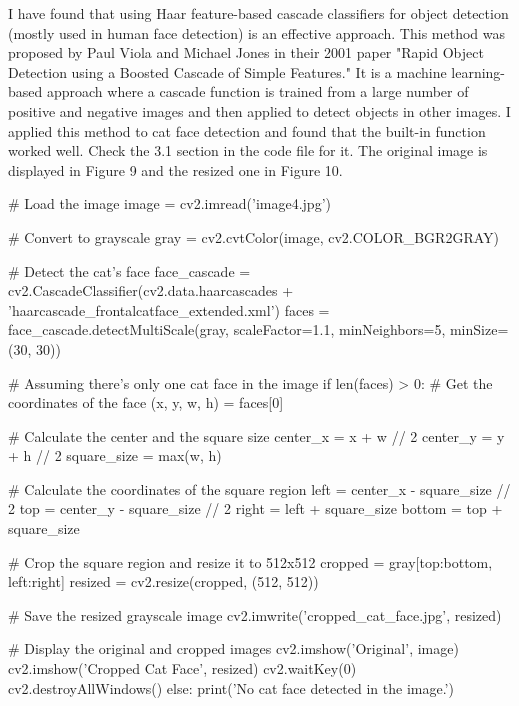 \documentclass[12pt]{article}
\begin{document}
\quad I have found that using Haar feature-based cascade classifiers for object detection (mostly used in human face detection) is an effective approach. This method was proposed by Paul Viola and Michael Jones in their 2001 paper "Rapid Object Detection using a Boosted Cascade of Simple Features." It is a machine learning-based approach where a cascade function is trained from a large number of positive and negative images and then applied to detect objects in other images. I applied this method to cat face detection and found that the built-in function worked well. Check the 3.1 section in the code file for it. The original image is displayed in Figure 9 and the resized one in Figure 10.
\begin{python}
# Load the image
image = cv2.imread('image4.jpg')

# Convert to grayscale
gray = cv2.cvtColor(image, cv2.COLOR_BGR2GRAY)

# Detect the cat's face
face_cascade = cv2.CascadeClassifier(cv2.data.haarcascades + 'haarcascade_frontalcatface_extended.xml')
faces = face_cascade.detectMultiScale(gray, scaleFactor=1.1, minNeighbors=5, minSize=(30, 30))

# Assuming there's only one cat face in the image
if len(faces) > 0:
    # Get the coordinates of the face
    (x, y, w, h) = faces[0]
    
    # Calculate the center and the square size
    center_x = x + w // 2
    center_y = y + h // 2
    square_size = max(w, h)
    
    # Calculate the coordinates of the square region
    left = center_x - square_size // 2
    top = center_y - square_size // 2
    right = left + square_size
    bottom = top + square_size
    
    # Crop the square region and resize it to 512x512
    cropped = gray[top:bottom, left:right]
    resized = cv2.resize(cropped, (512, 512))
    
    # Save the resized grayscale image
    cv2.imwrite('cropped_cat_face.jpg', resized)
    
    # Display the original and cropped images
    cv2.imshow('Original', image)
    cv2.imshow('Cropped Cat Face', resized)
    cv2.waitKey(0)
    cv2.destroyAllWindows()
else:
    print('No cat face detected in the image.')
    \end{python}
\end{document}
